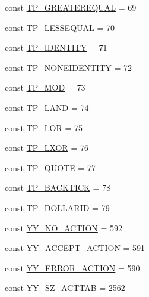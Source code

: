 \begin{DoxyCompactItemize}
\item 
const \hyperlink{class_smarty___internal___templateparser_ad4b3c25cedc77ca9dbd6d645dada59e1}{T\+P\+\_\+\+G\+R\+E\+A\+T\+E\+R\+E\+Q\+U\+A\+L} = 69
\item 
const \hyperlink{class_smarty___internal___templateparser_af78329c09a029b7ef180ae5252ea0417}{T\+P\+\_\+\+L\+E\+S\+S\+E\+Q\+U\+A\+L} = 70
\item 
const \hyperlink{class_smarty___internal___templateparser_a0b55981b0a23cdc4fb3360d5cbe78863}{T\+P\+\_\+\+I\+D\+E\+N\+T\+I\+T\+Y} = 71
\item 
const \hyperlink{class_smarty___internal___templateparser_a6a9026832e65d663d04883e398e08b7d}{T\+P\+\_\+\+N\+O\+N\+E\+I\+D\+E\+N\+T\+I\+T\+Y} = 72
\item 
const \hyperlink{class_smarty___internal___templateparser_a393232721379fdca842642013f8af0ee}{T\+P\+\_\+\+M\+O\+D} = 73
\item 
const \hyperlink{class_smarty___internal___templateparser_a83e2babc81bd20465754552482d6ba26}{T\+P\+\_\+\+L\+A\+N\+D} = 74
\item 
const \hyperlink{class_smarty___internal___templateparser_a06dfb32cf5f4306a58d1f71bb6e31ed2}{T\+P\+\_\+\+L\+O\+R} = 75
\item 
const \hyperlink{class_smarty___internal___templateparser_ab1201023b00aa139377f0919c2c5aec9}{T\+P\+\_\+\+L\+X\+O\+R} = 76
\item 
const \hyperlink{class_smarty___internal___templateparser_a6209177562b81d2062fde5f3638fa303}{T\+P\+\_\+\+Q\+U\+O\+T\+E} = 77
\item 
const \hyperlink{class_smarty___internal___templateparser_a2670af64de288c7173febed70036fde2}{T\+P\+\_\+\+B\+A\+C\+K\+T\+I\+C\+K} = 78
\item 
const \hyperlink{class_smarty___internal___templateparser_a151d90c50cd7e23af997f4e916c73c8f}{T\+P\+\_\+\+D\+O\+L\+L\+A\+R\+I\+D} = 79
\item 
const \hyperlink{class_smarty___internal___templateparser_a0f6c1861a270043cc4facee4f97d95bb}{Y\+Y\+\_\+\+N\+O\+\_\+\+A\+C\+T\+I\+O\+N} = 592
\item 
const \hyperlink{class_smarty___internal___templateparser_a5b4b8af3d51108107c7a732327bf5cbe}{Y\+Y\+\_\+\+A\+C\+C\+E\+P\+T\+\_\+\+A\+C\+T\+I\+O\+N} = 591
\item 
const \hyperlink{class_smarty___internal___templateparser_a86105f08ea37e26f27d0eae2f6b6085c}{Y\+Y\+\_\+\+E\+R\+R\+O\+R\+\_\+\+A\+C\+T\+I\+O\+N} = 590
\item 
const \hyperlink{class_smarty___internal___templateparser_a8b22de670a250b89ee356adaa5596a7a}{Y\+Y\+\_\+\+S\+Z\+\_\+\+A\+C\+T\+T\+A\+B} = 2562

\end{DoxyCompactItemize}
